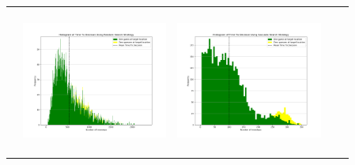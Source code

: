 \begin{landscape}
\begin{table}[h!]
\begin{tabular}{ | c | c | c | c | c |}
\begin{minipage}[c][48mm][c]{48mm}
    \end{minipage}
    &
    \begin{minipage}[c][48mm][c]{48mm}
      \includegraphics[width=48mm, height=48mm]{Chapters/MultiAgentTargetDetection/Figs/Histograms/VaryingInitBelief/75/75RandomHistogram.png}
    \end{minipage}
    &
    \begin{minipage}[c][48mm][c]{48mm}
      \includegraphics[width=48mm, height=48mm]{Chapters/MultiAgentTargetDetection/Figs/Histograms/VaryingInitBelief/75/75SaccadicHistogram.png}
    \end{minipage}
    \\


\end{tabular}
\end{table}
\end{landscape}

